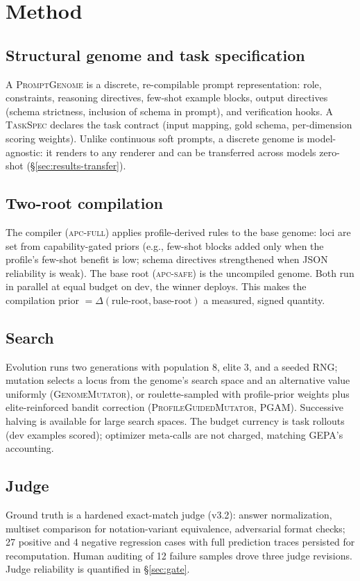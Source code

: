 \documentclass[11pt]{article}
\begin{document}
\section{Method}
\label{sec:method}

\subsection{Structural genome and task specification}
A \textsc{PromptGenome} is a discrete, re-compilable prompt representation: role, constraints, reasoning directives, few-shot example blocks, output directives (schema strictness, inclusion of schema in prompt), and verification hooks. A \textsc{TaskSpec} declares the task contract (input mapping, gold schema, per-dimension scoring weights). Unlike continuous soft prompts, a discrete genome is model-agnostic: it renders to any renderer and can be transferred across models zero-shot (\S\ref{sec:results-transfer}).

\subsection{Two-root compilation}
The compiler (\textsc{apc-full}) applies profile-derived rules to the base genome: loci are set from capability-gated priors (e.g., few-shot blocks added only when the profile's few-shot benefit is low; schema directives strengthened when JSON reliability is weak). The base root (\textsc{apc-safe}) is the uncompiled genome. Both run in parallel at equal budget on dev, the winner deploys. This makes the compilation prior $= \Delta(\text{rule-root},\text{base-root})$ a measured, signed quantity.

\subsection{Search}
Evolution runs two generations with population 8, elite 3, and a seeded RNG; mutation selects a locus from the genome's search space and an alternative value uniformly (\textsc{GenomeMutator}), or roulette-sampled with profile-prior weights plus elite-reinforced bandit correction (\textsc{ProfileGuidedMutator}, PGAM). Successive halving is available for large search spaces. The budget currency is task rollouts (dev examples scored); optimizer meta-calls are not charged, matching GEPA's accounting.

\subsection{Judge}
Ground truth is a hardened exact-match judge (v3.2): answer normalization, multiset comparison for notation-variant equivalence, adversarial format checks; 27 positive and 4 negative regression cases with full prediction traces persisted for recomputation. Human auditing of 12 failure samples drove three judge revisions. Judge reliability is quantified in \S\ref{sec:gate}.
\end{document}
